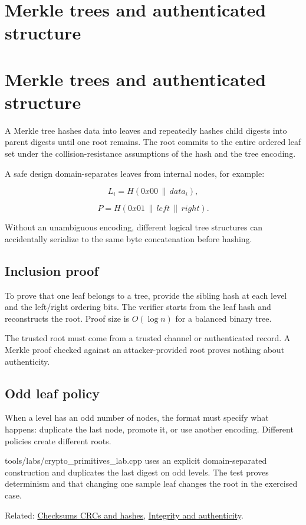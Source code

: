 \hypertarget{appendix-098192f8d46d}{}
\section*{Merkle trees and authenticated structure}
\section{Merkle trees and authenticated structure}\label{appendix-098192f8d46d-merkle-trees-and-authenticated-structure}

A Merkle tree hashes data into leaves and repeatedly hashes child digests into parent digests until one root remains. The root commits to the entire ordered leaf set under the collision-resistance assumptions of the hash and the tree encoding.

A safe design domain-separates leaves from internal nodes, for example:

\[
L_i=H(0x00\,\|\,data_i),
\]

\[
P=H(0x01\,\|\,left\,\|\,right).
\]

Without an unambiguous encoding, different logical tree structures can accidentally serialize to the same byte concatenation before hashing.

\subsection{Inclusion proof}\label{appendix-098192f8d46d-inclusion-proof}

To prove that one leaf belongs to a tree, provide the sibling hash at each level and the left/right ordering bits. The verifier starts from the leaf hash and reconstructs the root. Proof size is \(O(\log n)\) for a balanced binary tree.

The trusted root must come from a trusted channel or authenticated record. A Merkle proof checked against an attacker-provided root proves nothing about authenticity.

\subsection{Odd leaf policy}\label{appendix-098192f8d46d-odd-leaf-policy}

When a level has an odd number of nodes, the format must specify what happens: duplicate the last node, promote it, or use another encoding. Different policies create different roots.

tools/labs/crypto\_primitives\_lab.cpp uses an explicit domain-separated construction and duplicates the last digest on odd levels. The test proves determinism and that changing one sample leaf changes the root in the exercised case.

Related: \hyperref[appendix-ed338677de0a]{Checksums CRCs and hashes}, \hyperref[appendix-cbe594d1ab0a]{Integrity and authenticity}.
